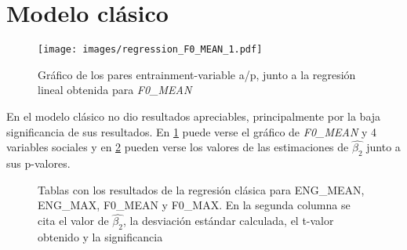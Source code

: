 \section{Modelo clásico}

\begin{figure}
\texttt{[image: images/regression\_F0\_MEAN\_1.pdf]}
\caption{Gráfico de los pares entrainment-variable a/p, junto a la regresión lineal obtenida \label{regresion_clasica} para \emph{F0\_MEAN}}
\end{figure}


En el modelo clásico no dio resultados apreciables, principalmente por la baja significancia de sus resultados. En \ref{regresion_clasica} puede verse el gráfico de \emph{F0\_MEAN} y 4 variables sociales y en \ref{regresion_clasica_tabla} pueden verse los valores de las estimaciones de $\widehat{\beta_2}$ junto a sus p-valores.

\begin{figure}

\caption{Tablas con los resultados de la regresión clásica para ENG\_MEAN, ENG\_MAX, F0\_MEAN y F0\_MAX. En la segunda columna se cita el valor de $\widehat{\beta_2}$, la desviación estándar calculada, el t-valor obtenido y la significancia}\label{regresion_clasica_tabla}
\end{figure}

